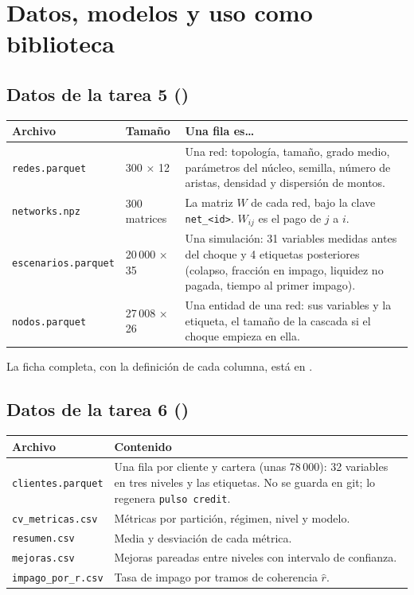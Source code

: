 \chapter{Datos, modelos y uso como biblioteca}

\section{Datos de la tarea 5 ()}
\begin{longtable}{L{0.24\textwidth}L{0.14\textwidth}L{0.54\textwidth}}
\toprule
\textbf{Archivo} & \textbf{Tamaño} & \textbf{Una fila es…} \\
\midrule
\endhead
\texttt{redes.parquet} & 300 × 12 & Una red: topología, tamaño, grado medio, parámetros
del núcleo, semilla, número de aristas, densidad y dispersión de montos. \\
\texttt{networks.npz} & 300 matrices & La matriz $W$ de cada red, bajo la clave
\texttt{net\_<id>}. $W_{ij}$ es el pago de $j$ a $i$. \\
\texttt{escenarios.parquet} & 20\,000 × 35 & Una simulación: 31 variables medidas antes
del choque y 4 etiquetas posteriores (colapso, fracción en impago, liquidez no pagada,
tiempo al primer impago). \\
\texttt{nodos.parquet} & 27\,008 × 26 & Una entidad de una red: sus variables y la
etiqueta, el tamaño de la cascada si el choque empieza en ella. \\
\bottomrule
\end{longtable}
La ficha completa, con la definición de cada columna, está en .

\section{Datos de la tarea 6 ()}
\begin{longtable}{L{0.24\textwidth}L{0.68\textwidth}}
\toprule
\textbf{Archivo} & \textbf{Contenido} \\
\midrule
\endhead
\texttt{clientes.parquet} & Una fila por cliente y cartera (unas 78\,000): 32 variables
en tres niveles y las etiquetas. No se guarda en git; lo regenera
\texttt{pulso credit}. \\
\texttt{cv\_metricas.csv} & Métricas por partición, régimen, nivel y modelo. \\
\texttt{resumen.csv} & Media y desviación de cada métrica. \\
\texttt{mejoras.csv} & Mejoras pareadas entre niveles con intervalo de confianza. \\
\texttt{impago\_por\_r.csv} & Tasa de impago por tramos de coherencia $\hat r$. \\
\bottomrule
\end{longtable}

